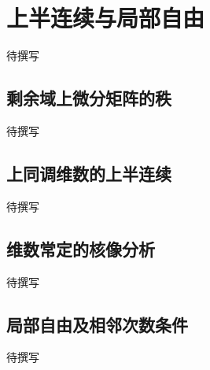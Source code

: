 
% 
% 

\section{上半连续与局部自由}
\label{g5:sec:2003}

待撰写

\subsection{剩余域上微分矩阵的秩}
\label{g5:subsec:2003:01}
待撰写

\subsection{上同调维数的上半连续}
\label{g5:subsec:2003:02}
待撰写

\subsection{维数常定的核像分析}
\label{g5:subsec:2003:03}
待撰写

\subsection{局部自由及相邻次数条件}
\label{g5:subsec:2003:04}
待撰写
